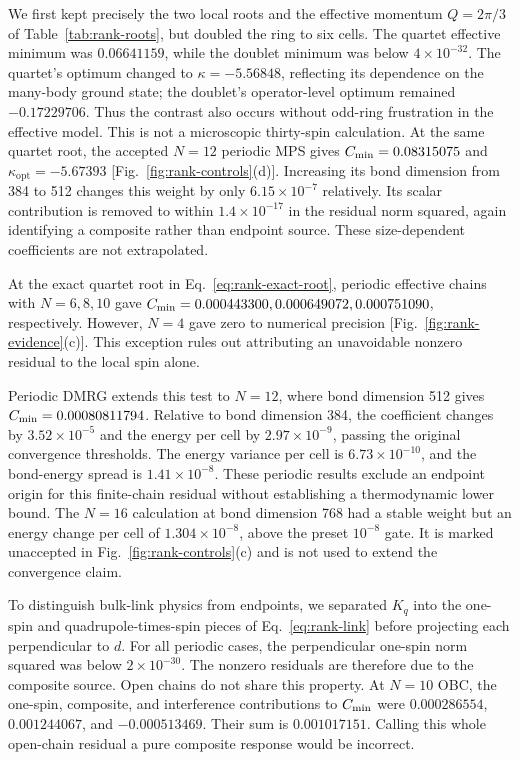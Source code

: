 We first kept precisely the two local roots and the effective momentum
$Q=2\pi/3$ of Table~\ref{tab:rank-roots}, but doubled the ring to six cells.
The quartet effective minimum was $0.06641159$, while the doublet minimum
was below $4\times10^{-32}$. The quartet's optimum changed to
$\kappa=-5.56848$, reflecting its dependence on the many-body ground state;
the doublet's operator-level optimum remained $-0.17229706$.
Thus the contrast also occurs without odd-ring frustration in the effective
model. This is not a microscopic thirty-spin calculation.
At the same quartet root, the accepted $N=12$ periodic MPS gives
$C_{\mathrm{min}}=0.08315075$ and $\kappa_{\mathrm{opt}}=-5.67393$
[Fig.~\ref{fig:rank-controls}(d)]. Increasing its bond dimension from
384 to 512 changes this weight by only $6.15\times10^{-7}$ relatively.
Its scalar contribution is removed to within $1.4\times10^{-17}$ in
the residual norm squared, again identifying a composite rather than
endpoint source. These size-dependent coefficients are not extrapolated.

At the exact quartet root in Eq.~\eqref{eq:rank-exact-root}, periodic
effective chains with $N=6,8,10$ gave
$C_{\mathrm{min}}=0.000443300,0.000649072,0.000751090$, respectively.
However, $N=4$ gave zero to numerical precision
[Fig.~\ref{fig:rank-evidence}(c)]. This exception rules out attributing an
unavoidable nonzero residual to the local spin alone.

Periodic DMRG extends this test to $N=12$, where bond dimension 512 gives
$C_{\mathrm{min}}=0.00080811794$. Relative to bond dimension 384, the coefficient
changes by $3.52\times10^{-5}$ and the energy per cell by
$2.97\times10^{-9}$, passing the original convergence thresholds.
The energy variance per cell is $6.73\times10^{-10}$, and the bond-energy
spread is $1.41\times10^{-8}$. These periodic results exclude an endpoint
origin for this finite-chain residual without establishing a thermodynamic
lower bound.
The $N=16$ calculation at bond dimension 768 had a stable weight but an
energy change per cell of $1.304\times10^{-8}$, above the preset
$10^{-8}$ gate. It is marked unaccepted in Fig.~\ref{fig:rank-controls}(c)
and is not used to extend the convergence claim.

To distinguish bulk-link physics from endpoints, we separated $K_q$ into the
one-spin and quadrupole-times-spin pieces of Eq.~\eqref{eq:rank-link} before
projecting each perpendicular to $d$. For all periodic cases, the perpendicular
one-spin norm squared was below $2\times10^{-30}$. The nonzero residuals are
therefore due to the composite source. Open chains do not share this property.
At $N=10$ OBC, the one-spin, composite, and interference contributions to
$C_{\mathrm{min}}$ were $0.000286554$, $0.001244067$, and $-0.000513469$.
Their sum is $0.001017151$. Calling this whole open-chain residual a pure
composite response would be incorrect.

